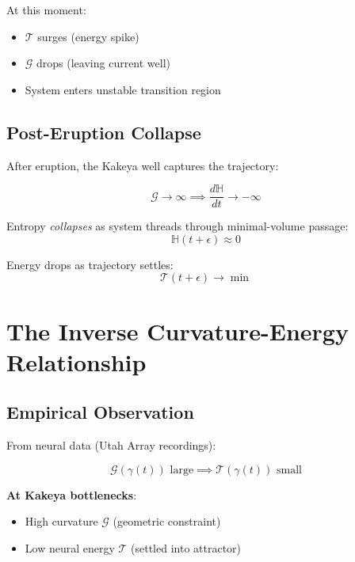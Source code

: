 \documentclass[12pt]{article}
\begin{document}
At this moment:
\begin{itemize}
\item $\mathcal{T}$ surges (energy spike)
\item $\mathcal{G}$ drops (leaving current well)
\item System enters unstable transition region
\end{itemize}

\subsection{Post-Eruption Collapse}

After eruption, the Kakeya well captures the trajectory:

\begin{equation}
\mathcal{G} \to \infty \implies \frac{d\mathbb{H}}{dt} \to -\infty
\end{equation}

Entropy \emph{collapses} as system threads through minimal-volume passage:
\begin{equation}
\mathbb{H}(t + \epsilon) \approx 0
\end{equation}

Energy drops as trajectory settles:
\begin{equation}
\mathcal{T}(t + \epsilon) \to \min
\end{equation}

\section{The Inverse Curvature-Energy Relationship}

\subsection{Empirical Observation}

From neural data (Utah Array recordings):

\begin{equation}\label{eq:inverse}
\boxed{\mathcal{G}(\gamma(t)) \text{ large} \implies \mathcal{T}(\gamma(t)) \text{ small}}
\end{equation}

\textbf{At Kakeya bottlenecks}:
\begin{itemize}
\item High curvature $\mathcal{G}$ (geometric constraint)
\item Low neural energy $\mathcal{T}$ (settled into attractor)
\end{itemize}
\end{document}
